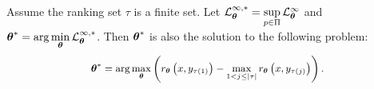 
\begin{theorem*}
Assume the ranking set $\tau$ is a finite set. Let $\mathcal{L}_{{\boldsymbol{\theta}}}^{\infty,*} = \sup\limits_{p\in\Pi}\mathcal{L}_{{\boldsymbol{\theta}}}^{\infty}$ and $ \boldsymbol{\theta}^{*} = \arg\min\limits_{{\boldsymbol{\theta}}} \mathcal{L}_{{\boldsymbol{\theta}}}^{\infty,*} $.  Then $ \boldsymbol{\theta}^{*}$ is also the solution to the following problem:
		\begin{equation*}
		\fontsize{9}{3}\selectfont{
		\begin{aligned}
			\wms =	\arg\max\limits_{\wm}\left(r_{\wm}\left(x,y_{\tau(1)}\right)-\max\limits_{1<j\leq |\tau|}r_{\wm}\left(x,y_{\tau(j)}\right)\right).
		\end{aligned}}
\end{equation*}
\end{theorem*}

